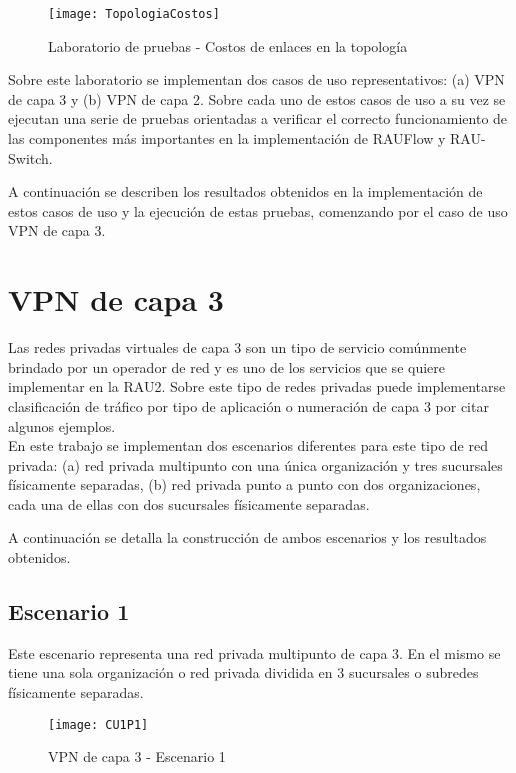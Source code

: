 \begin{figure}[ht!] 
\centering    
\texttt{[image: TopologiaCostos]}
\caption[Laboratorio de pruebas - Costos de enlaces en la topolog\'ia]{Laboratorio de pruebas - Costos de enlaces en la topolog\'ia}
\label{fig:LaboratorioDePruebasCostos}
\end{figure}

Sobre este laboratorio se implementan dos casos de uso representativos: (a) VPN de capa 3 y (b) VPN de capa 2. Sobre cada uno de estos casos de uso a su vez se ejecutan una serie de pruebas orientadas a verificar el correcto funcionamiento de las componentes m\'as importantes en la implementaci\'on de RAUFlow y RAU-Switch.

A continuaci\'on se describen los resultados obtenidos en la implementaci\'on de estos casos de uso y la ejecuci\'on de estas pruebas, comenzando por el caso de uso VPN de capa 3.

\section{VPN de capa 3}

Las redes privadas virtuales de capa 3 son un tipo de servicio comúnmente brindado por un operador de red y es uno de los servicios que se quiere implementar en la RAU2. Sobre este tipo de redes privadas puede implementarse clasificaci\'on de tr\'afico por tipo de aplicaci\'on o numeraci\'on de capa 3 por citar algunos ejemplos.\\

En este trabajo se implementan dos escenarios diferentes para este tipo de red privada: (a) red privada multipunto con una \'unica organizaci\'on y tres sucursales f\'isicamente separadas, (b) red privada punto a punto con dos organizaciones, cada una de ellas con dos sucursales f\'isicamente separadas.

A continuaci\'on se detalla la construcci\'on de ambos escenarios y los resultados obtenidos.

\subsection{Escenario 1}

Este escenario representa una red privada multipunto de capa 3. En el mismo se tiene una sola organizaci\'on o red privada dividida en 3 sucursales o subredes físicamente separadas.

\begin{figure}[ht!] 
\centering    
\texttt{[image: CU1P1]}
\caption[VPN de capa 3 - Escenario 1]{VPN de capa 3 - Escenario 1}
\label{fig:CUP1}
\end{figure}

